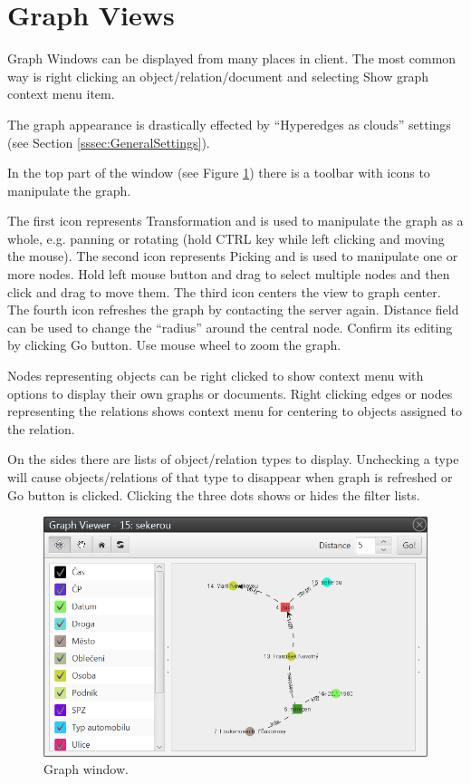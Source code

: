 \section{Graph Views}
\label{ssec:Graphs}

Graph Windows can be displayed from many places in \textan{} client. The most
common way is right clicking an object/relation/document and selecting Show
graph context menu item.

The graph appearance is drastically effected by ``Hyperedges as clouds'' settings
(see Section \ref{sssec:GeneralSettings}).

In the top part of the window (see Figure \ref{fig:Graph}) there is a toolbar
with icons to manipulate the graph.

The first icon represents Transformation and is used to manipulate the graph as
a whole, e.g. panning or rotating (hold CTRL key while left clicking and moving
the mouse). The second icon represents Picking and is used to manipulate one or
more nodes. Hold left mouse button and drag to select multiple nodes and then
click and drag to move them. The third icon centers the view to graph center.
The fourth icon refreshes the graph by contacting the server again. Distance
field can be used to change the ``radius'' around the central node. Confirm its
editing by clicking Go button. Use mouse wheel to zoom the graph.

Nodes representing objects can be right clicked to show context menu with
options to display their own graphs or documents. Right clicking edges or
nodes representing the relations shows context menu for centering to objects
assigned to the relation.

On the sides there are lists of object/relation types to display. Unchecking
a type will cause objects/relations of that type to disappear when graph is
refreshed or Go button is clicked. Clicking the three dots shows or hides the
filter lists.

\begin{figure}[!htb]
        \centering
        \includegraphics[width=\textwidth]{Images/graph}
        \caption{Graph window.}
        \label{fig:Graph}
\end{figure}

